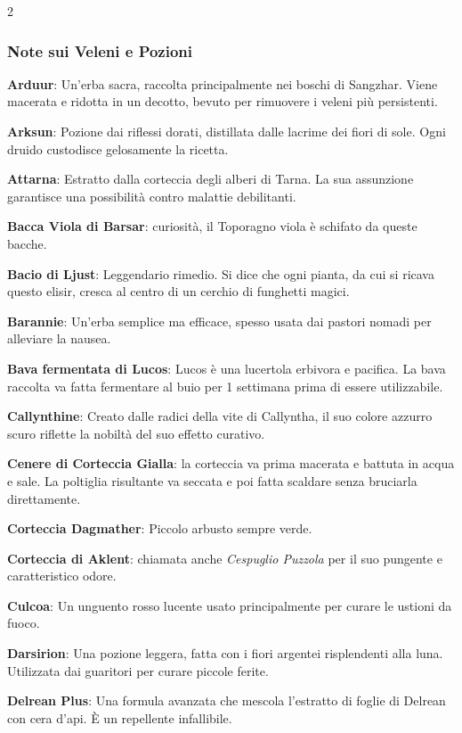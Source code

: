 \begin{multicols}{2}

\subsubsection{Note sui Veleni e Pozioni}

\textbf{Arduur}: Un'erba sacra, raccolta principalmente nei boschi di Sangzhar. Viene macerata e ridotta in un decotto, bevuto per rimuovere i veleni più persistenti.

\textbf{Arksun}: Pozione dai riflessi dorati, distillata dalle lacrime dei fiori di sole. Ogni druido custodisce gelosamente la ricetta.

\textbf{Attarna}: Estratto dalla corteccia degli alberi di Tarna. La sua assunzione garantisce una possibilità contro malattie debilitanti.

\textbf{Bacca Viola di Barsar}: curiosità, il Toporagno viola è schifato da queste bacche.

\textbf{Bacio di Ljust}: Leggendario rimedio. Si dice che ogni pianta, da cui si ricava questo elisir, cresca al centro di un cerchio di funghetti magici.

\textbf{Barannie}: Un'erba semplice ma efficace, spesso usata dai pastori nomadi per alleviare la nausea.

\textbf{Bava fermentata di Lucos}: Lucos è una lucertola erbivora e pacifica. La bava raccolta va fatta fermentare al buio per 1 settimana prima di essere utilizzabile.

\textbf{Callynthine}: Creato dalle radici della vite di Callyntha, il suo colore azzurro scuro riflette la nobiltà del suo effetto curativo.

\textbf{Cenere di Corteccia Gialla}: la corteccia va prima macerata e battuta in acqua e sale. La poltiglia risultante va seccata e poi fatta scaldare senza bruciarla direttamente.

\textbf{Corteccia Dagmather}: Piccolo arbusto sempre verde.

\textbf{Corteccia di Aklent}: chiamata anche \emph{Cespuglio Puzzola} per il suo pungente e caratteristico odore.

\textbf{Culcoa}: Un unguento rosso lucente usato principalmente per curare le ustioni da fuoco.

\textbf{Darsirion}: Una pozione leggera, fatta con i fiori argentei risplendenti alla luna. Utilizzata dai guaritori per curare piccole ferite.

\textbf{Delrean Plus}: Una formula avanzata che mescola l'estratto di foglie di Delrean con cera d'api. È un repellente infallibile.


\end{multicols}
